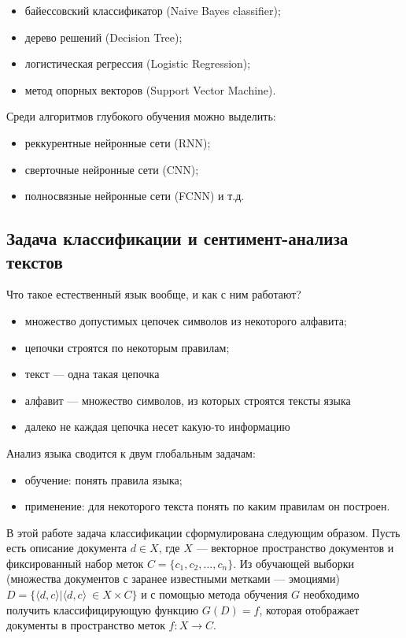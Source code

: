 \bigskip
\begin{itemize}
 \item байессовский классификатор (Naive Bayes classifier);
 \item дерево решений (Decision Tree);
 \item логистическая регрессия (Logistic Regression);
 \item метод опорных векторов (Support Vector Machine).
\end{itemize}

\bigskip\par
Среди алгоритмов глубокого обучения можно выделить:
\begin{itemize}
 \item реккурентные нейронные сети (RNN);
 \item сверточные нейронные сети (CNN);
 \item полносвязные нейронные сети (FCNN) и т.д.
\end{itemize}


\subsection{Задача классификации и сентимент-анализа текстов}

\noindent
Что такое естественный язык вообще, и как с ним работают?

\bigskip
\begin{itemize}
 \item множество допустимых цепочек символов из некоторого алфавита;
 \item цепочки строятся по некоторым правилам;
 \item текст --- одна такая цепочка
 \item алфавит --- множество символов, из которых строятся тексты языка
 \item далеко не каждая цепочка несет какую-то информацию
\end{itemize}

\bigskip\noindent
Анализ языка сводится к двум глобальным задачам:

\bigskip
\begin{itemize}
 \item обучение: понять правила языка;
 \item применение: для некоторого текста понять по каким правилам он построен.
\end{itemize}

\bigskip
В этой работе задача классификации сформулирована следующим образом. Пусть есть описание документа $d \in X$, где $X$ --- векторное пространство документов и фиксированный набор меток $C = \{c_1, c_2, \ldots, c_n\}$. Из обучающей выборки (множества документов с заранее известными метками --- эмоциями) $D = \{\langle d, c \rangle | \langle d, c \rangle\ \in X \times C\}$ и с помощью метода обучения $G$ необходимо получить классифицирующую функцию $G(D) = f$, которая отображает документы в пространство меток $f : X \to C$.


